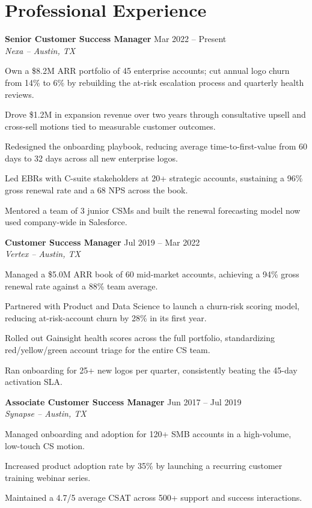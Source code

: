 \documentclass[10pt]{article}
\newcommand{\entryheader}[3]{%
  \textbf{\large #1} \hfill {\color{gray500}\small #3}\\{}
  {\color{csmteal}\itshape #2}
}
\begin{document}
\vspace{-6pt}
\section*{Professional Experience}
\vspace{-3pt}

\entryheader{Senior Customer Success Manager}{Nexa -- Austin, TX}{Mar 2022 -- Present}
\begin{tightlist}
  \item Own a \$8.2M ARR portfolio of 45 enterprise accounts; cut annual logo churn from
    14\% to 6\% by rebuilding the at-risk escalation process and quarterly health reviews.
  \item Drove \$1.2M in expansion revenue over two years through consultative upsell and
    cross-sell motions tied to measurable customer outcomes.
  \item Redesigned the onboarding playbook, reducing average time-to-first-value from 60
    days to 32 days across all new enterprise logos.
  \item Led EBRs with C-suite stakeholders at 20+ strategic accounts, sustaining a 96\%
    gross renewal rate and a 68 NPS across the book.
  \item Mentored a team of 3 junior CSMs and built the renewal forecasting model now used
    company-wide in Salesforce.
\end{tightlist}
\vspace{2pt}

\entryheader{Customer Success Manager}{Vertex -- Austin, TX}{Jul 2019 -- Mar 2022}
\begin{tightlist}
  \item Managed a \$5.0M ARR book of 60 mid-market accounts, achieving a 94\% gross
    renewal rate against a 88\% team average.
  \item Partnered with Product and Data Science to launch a churn-risk scoring model,
    reducing at-risk-account churn by 28\% in its first year.
  \item Rolled out Gainsight health scores across the full portfolio, standardizing
    red/yellow/green account triage for the entire CS team.
  \item Ran onboarding for 25+ new logos per quarter, consistently beating the 45-day
    activation SLA.
\end{tightlist}
\vspace{2pt}

\entryheader{Associate Customer Success Manager}{Synapse -- Austin, TX}{Jun 2017 -- Jul 2019}
\begin{tightlist}
  \item Managed onboarding and adoption for 120+ SMB accounts in a high-volume,
    low-touch CS motion.
  \item Increased product adoption rate by 35\% by launching a recurring customer
    training webinar series.
  \item Maintained a 4.7/5 average CSAT across 500+ support and success interactions.
\end{tightlist}
\end{document}
